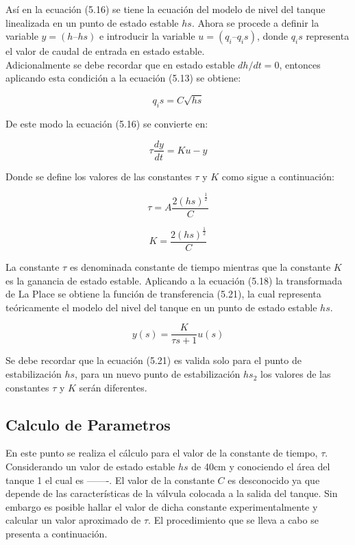 \documentclass[a4paper,12pt,twoside]{proyectotanquesecci}
\begin{document}
Así en la ecuación (5.16) se tiene la ecuación del modelo de nivel del tanque linealizada en un punto de estado estable $hs$. Ahora se procede a definir la variable $y=(h–hs)$ e introducir la variable $u=(q_{i}–q_{i}s)$, donde $q_{i}s$ representa el valor de caudal de entrada en estado estable. \\

Adicionalmente se debe recordar que en estado estable $dh/dt=0$, entonces aplicando esta condición a la ecuación (5.13) se obtiene:

\begin{equation}
q_{i}s=C\sqrt{hs}
\end{equation}

De este modo la ecuación (5.16) se convierte en:

\begin{equation}
\tau\frac{dy}{dt}=Ku-y
\end{equation}

Donde se define los valores de las constantes $\tau$ y $K$ como sigue a continuación:

\begin{equation}
\tau=A\frac{2(hs)^{\frac{1}{2}}}{C}
\end{equation}

\begin{equation}
K=\frac{2(hs)^{\frac{1}{2}}}{C}
\end{equation}

La constante $\tau$ es denominada constante de tiempo mientras que la constante $K$ es la ganancia de estado estable. Aplicando a la ecuación (5.18) la transformada de La Place se obtiene la función de transferencia (5.21), la cual representa teóricamente el modelo del nivel del tanque en un punto de estado estable $hs$.

\begin{equation}
y(s)=\frac{K}{\tau s+1}u(s)
\end{equation}

Se debe recordar que la ecuación (5.21) es valida solo para el punto de estabilización $hs$, para un nuevo punto de estabilización $hs_{2}$ los valores de las constantes $\tau$ y $K$ serán diferentes.




\subsection{Calculo de Parametros}

En este punto se realiza el cálculo para el valor de la constante de tiempo, $\tau$. Considerando un valor de estado estable $hs$ de 40cm y conociendo el área del tanque 1 el cual es -------. El valor de la constante $C$ es desconocido ya que depende de las características de la válvula colocada a la salida del tanque. Sin embargo es posible hallar el valor de dicha constante experimentalmente y calcular un valor aproximado de $\tau$. El procedimiento que se lleva a cabo se presenta a continuación. \\
\end{document}
